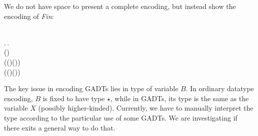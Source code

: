 We do not have space to present a complete encoding, but instead show
the encoding of \emph{Fin}:
\begin{hscode}\SaveRestoreHook
{}%
%
%
%
%
\>[3]{}\;\mathbin{:}\to \star\mathrel{=}{}\<[E]%
\\
\>[3]{}\<[5]%
\>[5]{}\mu\;\mathbin{:}\to \star.\,\lambda {}\mathbin{:}.\,{}\<[E]%
\\
\>[5]{}\<[7]%
\>[7]{}(\mathbin{:}\to \star)\to {}\<[E]%
\\
\>[5]{}\<[7]%
\>[7]{}((\mathbin{:})\to {}\;(\;))\to {}\<[E]%
\\
\>[5]{}\<[7]%
\>[7]{}((\mathbin{:})\to {}\;\to {}\;(\;))\to {}\<[E]%
\\
\>[5]{}\<[7]%
\>[7]{}\;\<[E]%
\ColumnHook
\end{hscode}\resethooks
The key issue in encoding GADTs lies in type of variable $B$. In
ordinary datatype encoding, $B$ is fixed to have type $\star$, while
in GADTs, its type is the same as the variable $X$ (possibly
higher-kinded). Currently, we have to manually interpret the type
according to the particular use of some GADTs. We are investigating if
there exits a general way to do that.
